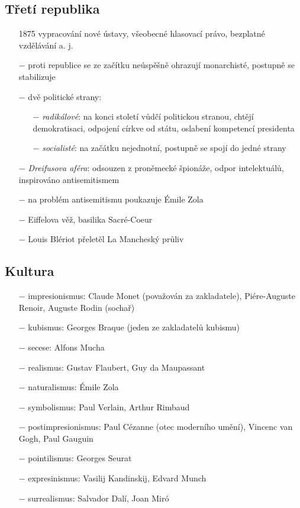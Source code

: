 \documentclass{article}
\begin{document}
\subsection*{Třetí republika}
\begin{itemize}
    \vspace{-0.5em}
    \setlength\itemsep{0.15em}
    \item[1875] vypracování nové ústavy, všeobecné hlasovací právo, bezplatné vzdělávání a. j.
    \item[$-$] proti republice se ze začítku neúspěšně ohrazují monarchisté, postupně se stabilizuje
    \item[$-$] dvě politické strany:
    \begin{itemize}
        \vspace{-0.5em}
        \setlength\itemsep{0.15em}
        \item[$-$] \textit{radikálové}: na konci století vůdčí politickou stranou, chtějí demokratisaci, odpojení církve od státu, oslabení kompetencí presidenta
        \item[$-$] \textit{socialisté}: na začátku nejednotní, postupně se spojí do jedné strany
    \end{itemize}
    \item[$-$] \textit{Dreifusova aféra}: odsouzen z proněmecké špionáže, odpor intelektuálů, inspirováno antisemitismem
    \item[$-$] na problém antisemitismu poukazuje Émile Zola
    \item[$-$] Eiffelova věž, basilika Sacré-Coeur
    \item[$-$] Louis Blériot přeletěl La Mancheský průliv
\end{itemize}

\subsection*{Kultura}
\begin{itemize}
    \vspace{-0.5em}
    \setlength\itemsep{0.15em}
    \item[$-$] impresionismus: Claude Monet (považován za zakladatele), Piére-Auguste Renoir, Auguste Rodin (sochař)
    \item[$-$] kubismus: Georges Braque (jeden ze zakladatelů kubismu)
    \item[$-$] secese: Alfons Mucha
    \item[$-$] realismus: Gustav Flaubert, Guy da Maupassant
    \item[$-$] naturalismus: Émile Zola
    \item[$-$] symbolismus: Paul Verlain, Arthur Rimbaud
    \item[$-$] postimpresionismus: Paul Cézanne (otec moderního umění), Vincenc van Gogh, Paul Gauguin
    \item[$-$] pointilismus: Georges Seurat
    \item[$-$] expresinismus: Vasilij Kandinskij, Edvard Munch
    \item[$-$] surrealismus: Salvador Dalí, Joan Miró
\end{itemize}
\end{document}
